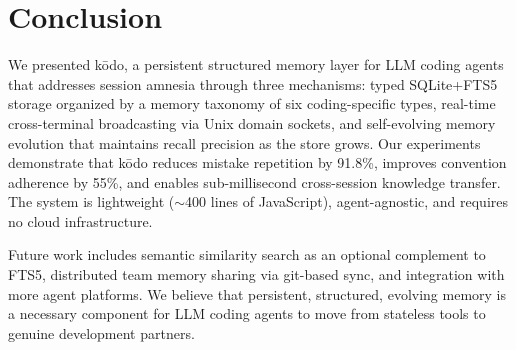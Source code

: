 \documentclass{article}
\begin{document}
\section{Conclusion}
\label{sec:conclusion}

We presented k\=odo, a persistent structured memory layer for LLM coding agents that addresses session amnesia through three mechanisms: typed SQLite+FTS5 storage organized by a memory taxonomy of six coding-specific types, real-time cross-terminal broadcasting via Unix domain sockets, and self-evolving memory evolution that maintains recall precision as the store grows. Our experiments demonstrate that k\=odo reduces mistake repetition by 91.8\%, improves convention adherence by 55\%, and enables sub-millisecond cross-session knowledge transfer. The system is lightweight ($\sim$400 lines of JavaScript), agent-agnostic, and requires no cloud infrastructure.

Future work includes semantic similarity search as an optional complement to FTS5, distributed team memory sharing via git-based sync, and integration with more agent platforms. We believe that persistent, structured, evolving memory is a necessary component for LLM coding agents to move from stateless tools to genuine development partners.
\end{document}
